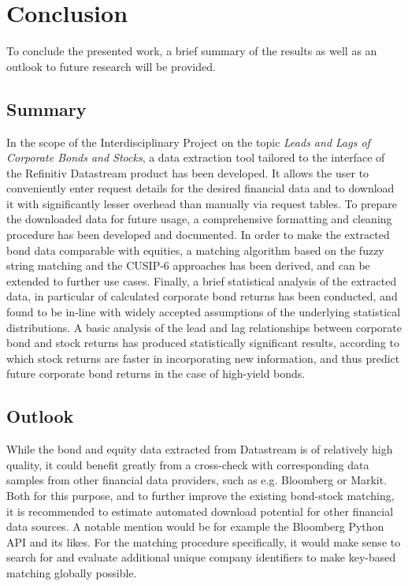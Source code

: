 \chapter{Conclusion} \label{chapter:Conclusion}
To conclude the presented work, a brief summary of the results as well as an outlook to future research will be provided. 

\section{Summary}
In the scope of the Interdisciplinary Project on the topic \textit{Leads and Lags of Corporate Bonds and Stocks}, a data extraction tool tailored to the interface of the Refinitiv Datastream product has been developed. It allows the user to conveniently enter request details for the desired financial data and to download it with significantly lesser overhead than manually via request tables. To prepare the downloaded data for future usage, a comprehensive formatting and cleaning procedure has been developed and documented. In order to make the extracted bond data comparable with equities, a matching algorithm based on the fuzzy string matching and the CUSIP-6 approaches has been derived, and can be extended to further use cases. Finally, a brief statistical analysis of the extracted data, in particular of calculated corporate bond returns has been conducted, and found to be in-line with widely accepted assumptions of the underlying statistical distributions. A basic analysis of the lead and lag relationships between corporate bond and stock returns has produced statistically significant results, according to which stock returns are faster in incorporating new information, and thus predict future corporate bond returns in the case of high-yield bonds. 

\section{Outlook}
While the bond and equity data extracted from Datastream is of relatively high quality, it could benefit greatly from a cross-check with corresponding data samples from other financial data providers, such as e.g. Bloomberg or Markit. Both for this purpose, and to further improve the existing bond-stock matching, it is recommended to estimate automated download potential for other financial data sources. A notable mention would be for example the Bloomberg Python API and its likes. For the matching procedure specifically, it would make sense to search for and evaluate additional unique company identifiers to make key-based matching globally possible. 

